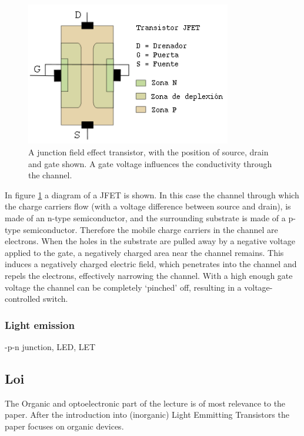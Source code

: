 \begin{figure}[!ht]
 \begin{center}
  \includegraphics[width=0.8\textwidth]{JFET}
  \caption{A junction field effect transistor, with the position of source, drain and gate shown. A gate voltage influences the conductivity through the channel.}
  \label{fig:JFET}
 \end{center}
\end{figure}

In figure \ref{fig:JFET} a diagram of a JFET is shown. In this case the channel through which the charge carriers flow (with a voltage difference between source and drain), is made of an n-type semiconductor, and the surrounding substrate is made of a p-type semiconductor. Therefore the mobile charge carriers in the channel are electrons. When the holes in the substrate are pulled away by a negative voltage applied to the gate, a negatively charged area near the channel remains. This induces a negatively charged electric field, which penetrates into the channel and repels the electrons, effectively narrowing the channel. With a high enough gate voltage the channel can be completely `pinched' off, resulting in a voltage-controlled switch.

\subsubsection{Light emission}

-p-n junction, LED, LET

\subsection{Loi}
The Organic and optoelectronic part of the lecture is of most relevance to the paper. After the introduction into (inorganic) Light Emmitting Transistors the paper focuses on organic devices. 

